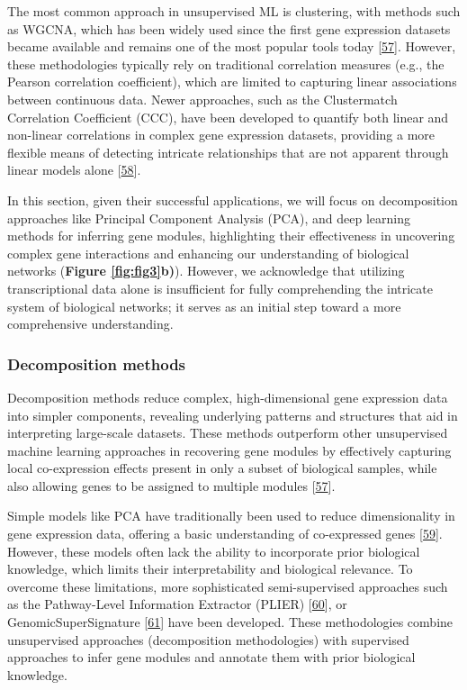 The most common approach in unsupervised ML is clustering, with methods such as WGCNA, which has been widely used since the first gene expression datasets became available and remains one of the most popular tools today {[}\protect\hyperlink{ref-1BVbSrr6M}{57}{]}.
However, these methodologies typically rely on traditional correlation measures (e.g., the Pearson correlation coefficient), which are limited to capturing linear associations between continuous data.
Newer approaches, such as the Clustermatch Correlation Coefficient (CCC), have been developed to quantify both linear and non-linear correlations in complex gene expression datasets, providing a more flexible means of detecting intricate relationships that are not apparent through linear models alone {[}\protect\hyperlink{ref-YgLIM2bZ}{58}{]}.

In this section, given their successful applications, we will focus on decomposition approaches like Principal Component Analysis (PCA), and deep learning methods for inferring gene modules, highlighting their effectiveness in uncovering complex gene interactions and enhancing our understanding of biological networks (\textbf{Figure \ref{fig:fig3}b)}).
However, we acknowledge that utilizing transcriptional data alone is insufficient for fully comprehending the intricate system of biological networks; it serves as an initial step toward a more comprehensive understanding.

\hypertarget{decomposition-methods}{%
\subsubsection{Decomposition methods}\label{decomposition-methods}}

Decomposition methods reduce complex, high-dimensional gene expression data into simpler components, revealing underlying patterns and structures that aid in interpreting large-scale datasets.
These methods outperform other unsupervised machine learning approaches in recovering gene modules by effectively capturing local co-expression effects present in only a subset of biological samples, while also allowing genes to be assigned to multiple modules {[}\protect\hyperlink{ref-1BVbSrr6M}{57}{]}.

Simple models like PCA have traditionally been used to reduce dimensionality in gene expression data, offering a basic understanding of co-expressed genes {[}\protect\hyperlink{ref-1703M7bru}{59}{]}.
However, these models often lack the ability to incorporate prior biological knowledge, which limits their interpretability and biological relevance.
To overcome these limitations, more sophisticated semi-supervised approaches such as the Pathway-Level Information Extractor (PLIER) {[}\protect\hyperlink{ref-Ki2ij7zE}{60}{]}, or GenomicSuperSignature {[}\protect\hyperlink{ref-X4fhSCkz}{61}{]} have been developed.
These methodologies combine unsupervised approaches (decomposition methodologies) with supervised approaches to infer gene modules and annotate them with prior biological knowledge.

